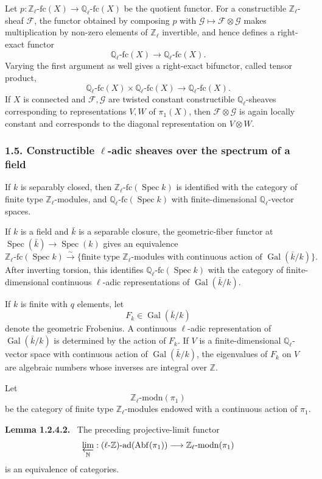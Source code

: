 \documentclass[12pt]{article}
\newcommand{\bZ}{\mathbb Z}
\newcommand{\bQ}{\mathbb Q}
\newcommand{\bN}{\mathbb N}
\newcommand{\cF}{\mathcal F}
\newcommand{\cG}{\mathcal G}
\newcommand{\Spec}{\operatorname{Spec}}
\newcommand{\Gal}{\operatorname{Gal}}
\newcommand{\fc}{\mathrm{fc}}
\newenvironment{statement}[1]{\par\medskip\noindent\textbf{#1.}\ }{\par\medskip}
\begin{document}
Let $p:\bZ_\ell\text{-}\fc(X)\to\bQ_\ell\text{-}\fc(X)$ be the quotient functor. For a
constructible $\bZ_\ell$-sheaf $\cF$, the functor obtained by composing $p$ with
$\cG\mapsto\cF\otimes\cG$ makes multiplication by non-zero elements of
$\bZ_\ell$ invertible, and hence defines a right-exact functor
\[
       \bQ_\ell\text{-}\fc(X)\longrightarrow\bQ_\ell\text{-}\fc(X).
\]
Varying the first argument as well gives a right-exact bifunctor, called tensor
product,
\[
       \bQ_\ell\text{-}\fc(X)\times\bQ_\ell\text{-}\fc(X)
       \longrightarrow\bQ_\ell\text{-}\fc(X).
\]
If $X$ is connected and $\cF,\cG$ are twisted constant constructible
$\bQ_\ell$-sheaves corresponding to representations $V,W$ of $\pi_1(X)$, then
$\cF\otimes\cG$ is again locally constant and corresponds to the diagonal
representation on $V\otimes W$.

\subsubsection*{1.5. Constructible $\ell$-adic sheaves over the spectrum of a field}

If $k$ is separably closed, then
$\bZ_\ell\text{-}\fc(\Spec k)$ is identified with the category of finite type
$\bZ_\ell$-modules, and $\bQ_\ell\text{-}\fc(\Spec k)$ with finite-dimensional
$\bQ_\ell$-vector spaces.

If $k$ is a field and $\bar k$ is a separable closure, the geometric-fiber functor at
$\Spec(\bar k)\to\Spec(k)$ gives an equivalence
\[
\bZ_\ell\text{-}\fc(\Spec k)\xrightarrow{\sim}
\{\text{finite type }\bZ_\ell\text{-modules with continuous action of }
\Gal(\bar k/k)\}.
\]
After inverting torsion, this identifies $\bQ_\ell\text{-}\fc(\Spec k)$ with the
category of finite-dimensional continuous $\ell$-adic representations of
$\Gal(\bar k/k)$.

If $k$ is finite with $q$ elements, let
\[
        F_k\in\Gal(\bar k/k)
\]
denote the geometric Frobenius. A continuous $\ell$-adic representation of
$\Gal(\bar k/k)$ is determined by the action of $F_k$. If $V$ is a finite-dimensional
$\bQ_\ell$-vector space with continuous action of $\Gal(\bar k/k)$, the eigenvalues
of $F_k$ on $V$ are algebraic numbers whose inverses are integral over $\bZ$.

Let
\[
       \bZ_\ell\text{-}\mathrm{modn}(\pi_1)
\]
be the category of finite type $\bZ_\ell$-modules endowed with a continuous action of
$\pi_1$.

\begin{statement}{Lemma 1.2.4.2}
The preceding projective-limit functor
\[
\varprojlim_{\bN}:(\ell\text{-}\bZ)\text{-}\mathrm{ad}(\mathrm{Abf}(\pi_1))
\longrightarrow
\bZ_\ell\text{-}\mathrm{modn}(\pi_1)
\]
is an equivalence of categories.
\end{statement}
\end{document}
